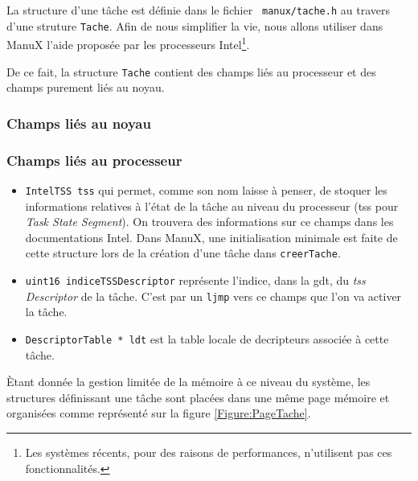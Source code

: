 \documentclass{book}
\begin{document}
   La structure d'une tâche est définie dans le fichier {\tt
manux/tache.h} au travers d'une struture \lstinline!Tache!. Afin de
nous simplifier la vie, nous allons utiliser dans ManuX l'aide
proposée par les processeurs Intel\footnote{Les systèmes récents, pour
  des raisons de performances, n'utilisent pas ces fonctionnalités.}.

   De ce fait, la structure \lstinline!Tache! contient des champs liés
au processeur et des champs purement liés au noyau.

%
\subsubsection{Champs liés au noyau}

%
\subsubsection{Champs liés au processeur}

\begin{itemize}
   \item \lstinline!IntelTSS tss! qui permet, comme son nom laisse à
penser, de stoquer les informations relatives à l'état de la tâche au
niveau du processeur ({\sc tss} pour {\em Task State Segment}). On
trouvera des informations sur ce champs dans les documentations Intel.
Dans ManuX, une initialisation minimale est faite de cette structure
lors de la création d'une tâche dans \lstinline!creerTache!.

   \item \lstinline!uint16 indiceTSSDescriptor! représente l'indice,
dans la {\sc gdt}, du {\em {\sc tss} Descriptor} de la tâche. C'est
par un \lstinline!ljmp! vers ce champs que l'on va activer la tâche.

   \item \lstinline!DescriptorTable * ldt! est la table locale de
decripteurs associée à cette tâche.
\end{itemize}

   Ètant donnée la gestion limitée de la mémoire à ce niveau du
système, les structures définissant une tâche sont placées dans une
même page mémoire et organisées comme représenté sur la figure
\ref{Figure:PageTache}.
\end{document}
